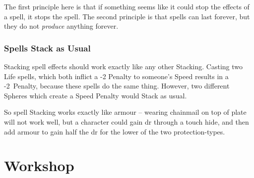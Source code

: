 \begin{multicols}{2}
The first principle here is that if something seems like it could stop the effects of a spell, it stops the spell.
The second principle is that spells can last forever, but they do not \emph{produce} anything forever.

\subsubsection{Spells Stack as Usual}

Stacking spell effects should work exactly like any other Stacking.%
Casting two Life spells, which both inflict a -2 Penalty to someone's Speed results in a -2~Penalty, because these spells do the same thing.
However, two different Spheres which create a Speed Penalty would Stack as usual.

So spell Stacking works exactly like armour -- wearing chainmail on top of plate will not work well, but a character could gain \gls{dr} through a touch hide, and then add armour to gain half the \gls{dr} for the lower of the two protection-types.

\end{multicols}

\section{ Workshop}

